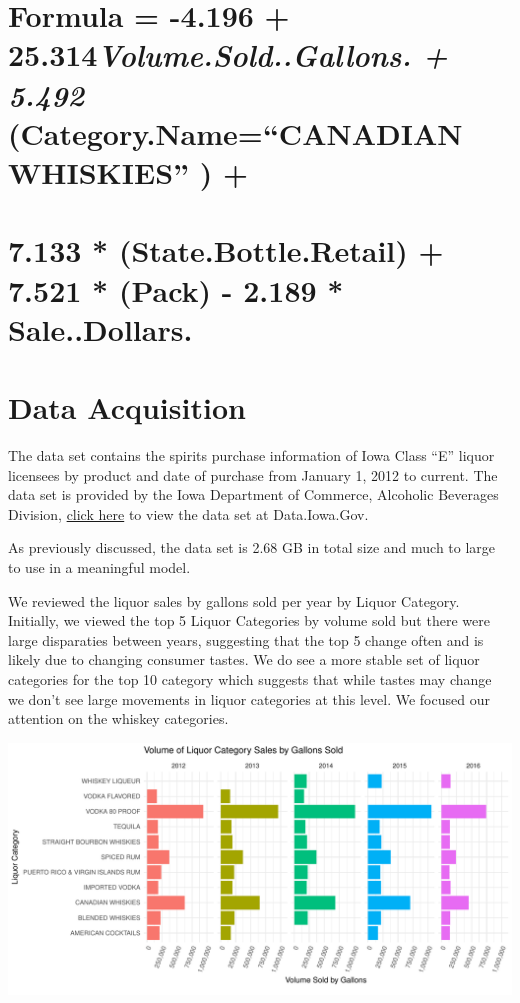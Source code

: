 \documentclass[]{elsarticle} %
\makeatletter
\def\maxwidth{\ifdim\Gin@nat@width>\linewidth\linewidth
\else\Gin@nat@width\fi}
\let\Oldincludegraphics\includegraphics
\renewcommand{\includegraphics}[1]{\Oldincludegraphics[width=\maxwidth]{#1}}
\makeatother
\begin{document}
\section{\texorpdfstring{Formula = -4.196 +
25.314\emph{Volume.Sold..Gallons. + 5.492 } (Category.Name=``CANADIAN
WHISKIES'' )
+}{Formula = -4.196 + 25.314Volume.Sold..Gallons. + 5.492  (Category.Name=CANADIAN WHISKIES ) +}}\label{formula--4.196-25.314volume.sold..gallons.-5.492-category.namecanadian-whiskies}

\section{7.133 * (State.Bottle.Retail) + 7.521 * (Pack) - 2.189 *
Sale..Dollars.}\label{state.bottle.retail-7.521-pack---2.189-sale..dollars.}

\newpage

\section{Data Acquisition}\label{data-acquisition}

The data set contains the spirits purchase information of Iowa Class
``E'' liquor licensees by product and date of purchase from January 1,
2012 to current. The data set is provided by the Iowa Department of
Commerce, Alcoholic Beverages Division,
\href{https://data.iowa.gov/Economy/Iowa-Liquor-Sales/m3tr-qhgy}{click
here} to view the data set at Data.Iowa.Gov.

As previously discussed, the data set is 2.68 GB in total size and much
to large to use in a meaningful model.

We reviewed the liquor sales by gallons sold per year by Liquor
Category. Initially, we viewed the top 5 Liquor Categories by volume
sold but there were large disparaties between years, suggesting that the
top 5 change often and is likely due to changing consumer tastes. We do
see a more stable set of liquor categories for the top 10 category which
suggests that while tastes may change we don't see large movements in
liquor categories at this level. We focused our attention on the whiskey
categories.

\includegraphics{Final_Project_files/figure-latex/unnamed-chunk-6-1.pdf}
\end{document}
